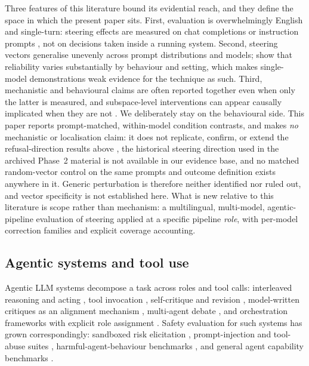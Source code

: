 Three features of this literature bound its evidential reach, and they define
the space in which the present paper sits. First, evaluation is overwhelmingly
English and single-turn: steering effects are measured on chat completions or
instruction prompts \citep{turner2023activation,rimsky2024steering}, not on
decisions taken inside a running system. Second, steering vectors generalise
unevenly across prompt distributions and models; \citet{tan2024analysing} show
that reliability varies substantially by behaviour and setting, which makes
single-model demonstrations weak evidence for the technique as such. Third,
mechanistic and behavioural claims are often reported together even when only
the latter is measured, and subspace-level interventions can appear causally
implicated when they are not \citep{makelov2024illusion}. We deliberately stay
on the behavioural side. This paper reports prompt-matched, within-model
condition contrasts, and makes \emph{no} mechanistic or localisation claim: it
does not replicate, confirm, or extend the refusal-direction results above
\citep{arditi2024refusal}, the historical steering direction used in the
archived Phase~2 material is not available in our evidence base, and no matched
random-vector control on the same prompts and outcome definition exists anywhere
in it. Generic perturbation is therefore neither identified nor ruled out, and
vector specificity is not established here. What is new relative to this
literature is scope rather than mechanism: a multilingual, multi-model,
agentic-pipeline evaluation of steering applied at a specific pipeline
\emph{role}, with per-model correction families and explicit coverage
accounting.

\subsection{Agentic systems and tool use}

Agentic LLM systems decompose a task across roles and tool calls: interleaved
reasoning and acting \citep{yao2023react}, tool invocation
\citep{schick2023toolformer,qin2024toolllm}, self-critique and revision
\citep{madaan2023selfrefine,shinn2023reflexion,saunders2022selfcritiquing},
model-written critiques as an alignment mechanism \citep{bai2022constitutional},
multi-agent debate \citep{du2024improving,khan2024debating}, and orchestration
frameworks with explicit role assignment
\citep{park2023generative,wu2023autogen,hong2024metagpt}. Safety evaluation for
such systems has grown correspondingly: sandboxed risk elicitation
\citep{ruan2024toolemu}, prompt-injection and tool-abuse suites
\citep{debenedetti2024agentdojo,greshake2023not}, harmful-agent-behaviour
benchmarks \citep{andriushchenko2025agentharm}, and general agent capability
benchmarks \citep{liu2024agentbench,mialon2024gaia}.

